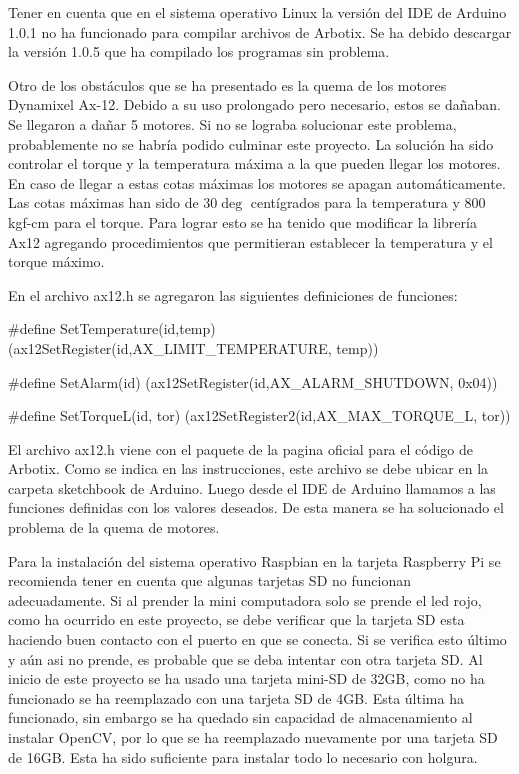 Tener en cuenta que en el sistema operativo Linux la versión del IDE de Arduino 1.0.1 no ha funcionado para compilar archivos de Arbotix. Se ha debido descargar la versión 1.0.5 que ha compilado los programas sin problema. 

Otro de los obstáculos que se ha presentado es la quema de los motores Dynamixel Ax-12. Debido a su uso prolongado pero necesario, estos se dañaban. Se llegaron a dañar 5 motores. Si no se lograba solucionar este problema, probablemente no se habría podido culminar este proyecto. La solución ha sido controlar el torque y la temperatura máxima a la que pueden llegar los motores. En caso de llegar a estas cotas máximas los motores se apagan automáticamente. Las cotas máximas han sido de $30\deg$ centígrados para la temperatura y 800 kgf-cm para el torque. Para lograr esto se ha tenido que modificar la librería Ax12 agregando procedimientos que permitieran establecer la temperatura y el torque máximo.

En el archivo ax12.h se agregaron las siguientes definiciones de funciones:

\#define SetTemperature(id,temp) (ax12SetRegister(id,AX\_LIMIT\_TEMPERATURE, temp))

\#define SetAlarm(id) (ax12SetRegister(id,AX\_ALARM\_SHUTDOWN, 0x04)) 

\#define SetTorqueL(id, tor) (ax12SetRegister2(id,AX\_MAX\_TORQUE\_L, tor)) 

El archivo ax12.h viene con el paquete de la pagina oficial para el código de Arbotix. Como se indica en las instrucciones, este archivo se debe ubicar en la carpeta sketchbook de Arduino. Luego desde el IDE de Arduino llamamos a las funciones definidas con los valores deseados. De esta manera se ha solucionado el problema de la quema de motores.

Para la instalación del sistema operativo Raspbian en la tarjeta Raspberry Pi se recomienda tener en cuenta que algunas tarjetas SD no funcionan adecuadamente. Si al prender la mini computadora solo se prende el led rojo, como ha ocurrido en este proyecto, se debe verificar que la tarjeta SD esta haciendo buen contacto con el puerto en que se conecta. Si se verifica esto último y aún asi no prende, es probable que se deba intentar con otra tarjeta SD. Al inicio de este proyecto se ha usado una tarjeta mini-SD de 32GB, como no ha funcionado se ha reemplazado con una tarjeta SD de 4GB. Esta última ha funcionado, sin embargo se ha quedado sin capacidad de almacenamiento al instalar OpenCV, por lo que se ha reemplazado nuevamente por una tarjeta SD de 16GB. Esta ha sido suficiente para instalar todo lo necesario con holgura.    

